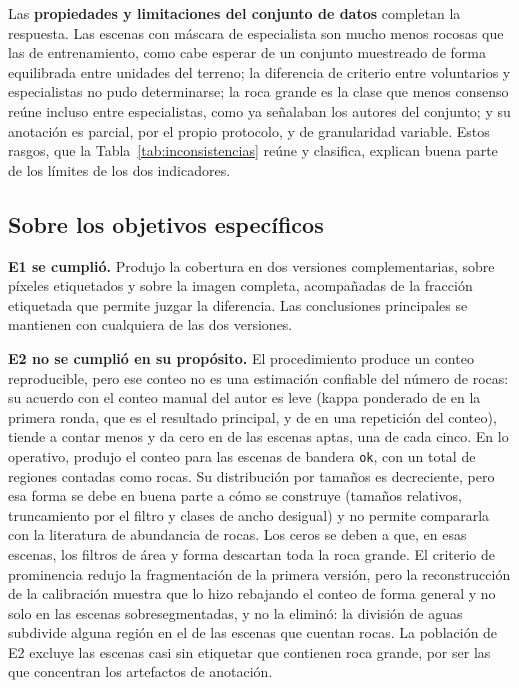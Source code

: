 Las \textbf{propiedades y limitaciones del conjunto de datos} completan la respuesta. Las
escenas con máscara de especialista son mucho menos rocosas que las de entrenamiento, como cabe
esperar de un conjunto muestreado de forma equilibrada entre unidades del terreno; la diferencia
de criterio entre voluntarios y especialistas no pudo determinarse; la roca grande
es la clase que menos consenso reúne incluso entre especialistas, como ya señalaban los autores
del conjunto; y su anotación es parcial, por el propio protocolo, y de granularidad variable.
Estos rasgos, que la Tabla~\ref{tab:inconsistencias} reúne y clasifica, explican buena parte de
los límites de los dos indicadores.

\subsection{Sobre los objetivos específicos}

\textbf{E1 se cumplió.} Produjo la cobertura en dos versiones complementarias, sobre píxeles
etiquetados y sobre la imagen completa, acompañadas de la fracción etiquetada que permite juzgar la
diferencia. Las conclusiones principales se mantienen con cualquiera de las dos versiones.

\textbf{E2 no se cumplió en su propósito.} El procedimiento produce un conteo reproducible, pero
ese conteo no es una estimación confiable del número de rocas: su acuerdo con el conteo manual
del autor es leve (kappa ponderado de \cVKappaPond{} en la primera ronda, que es el resultado
principal, y de \cVSegKappaPond{} en una repetición del conteo), tiende a contar menos y da cero en
\cBandaCero{} de las \cFlagOk{} escenas aptas, una de cada cinco. En lo operativo, produjo el
conteo para las \cFlagOk{} escenas de bandera \texttt{ok}, con un total de
\cNRocas{} regiones contadas como rocas. Su distribución por tamaños es decreciente, pero esa
forma se debe en buena parte a cómo se construye (tamaños relativos, truncamiento por el filtro y
clases de ancho desigual) y no permite compararla con la literatura de abundancia de rocas. Los
ceros se deben a que, en esas escenas, los filtros de
área y forma descartan toda la roca grande. El criterio de
prominencia redujo la fragmentación de la primera versión, pero la reconstrucción de la
calibración muestra que lo hizo rebajando el conteo de forma general y no solo en las escenas
sobresegmentadas, y no la eliminó: la división de aguas subdivide alguna región en el
\cPctSubdiv{} de las escenas que cuentan rocas. La población de E2 excluye las \cNNullBig{}
escenas casi sin etiquetar que contienen roca grande, por ser las que concentran los artefactos
de anotación.

